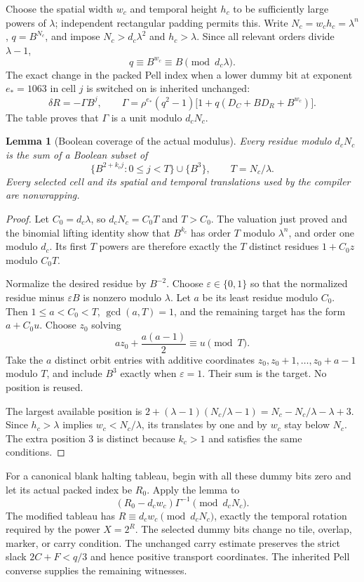 \documentclass[11pt,letterpaper]{article}
\newtheorem{lemma}[theorem]{Lemma}
\theoremstyle{remark}
\begin{document}
Choose the spatial width $w_c$ and temporal height $h_c$ to be sufficiently
large powers of $\lambda$; independent rectangular padding permits this.
Write $N_c=w_ch_c=\lambda^n$, $q=B^{N_c}$, and impose
$N_c>d_c\lambda^2$ and $h_c>\lambda$.  Since all relevant orders divide
$\lambda-1$,
\[
 q\equiv B^{w_c}\equiv B\pmod{d_c\lambda}.
\]
The exact change in the packed Pell index when a lower dummy bit at
exponent $e_*=1063$ in cell $j$ is switched on is inherited unchanged:
\[
 \delta R=-\Gamma B^j,\qquad
 \Gamma=\rho^{e_*}(q^2-1)
        \bigl[1+q(D_C+BD_R+B^{w_c})\bigr].
\]
The table proves that $\Gamma$ is a unit modulo $d_cN_c$.

\begin{lemma}[Boolean coverage of the actual modulus]\label{lem:padding}
Every residue modulo $d_cN_c$ is the sum of a Boolean subset of
\[
 \{B^{2+k_cj}:0\le j<T\}\cup\{B^3\},\qquad T=N_c/\lambda.
\]
Every selected cell and its spatial and temporal translations used by the
compiler are nonwrapping.
\end{lemma}
\begin{proof}
Let $C_0=d_c\lambda$, so $d_cN_c=C_0T$ and $T>C_0$.
The valuation just proved and the binomial lifting identity show that
$B^{k_c}$ has order $T$ modulo $\lambda^n$, and order one modulo $d_c$.
Its first $T$ powers are therefore exactly the $T$ distinct residues
$1+C_0z$ modulo $C_0T$.

Normalize the desired residue by $B^{-2}$.  Choose
$\varepsilon\in\{0,1\}$ so that the normalized residue minus
$\varepsilon B$ is nonzero modulo $\lambda$.  Let $a$ be its least
residue modulo $C_0$.  Then $1\le a<C_0<T$, $\gcd(a,T)=1$, and the
remaining target has the form $a+C_0u$.  Choose $z_0$ solving
\[
 az_0+\frac{a(a-1)}2\equiv u\pmod T.
\]
Take the $a$ distinct orbit entries with additive coordinates
$z_0,z_0+1,\ldots,z_0+a-1$ modulo $T$, and include $B^3$ exactly when
$\varepsilon=1$.  Their sum is the target.  No position is reused.

The largest available position is
$2+(\lambda-1)(N_c/\lambda-1)=N_c-N_c/\lambda-\lambda+3$.
Since $h_c>\lambda$ implies $w_c<N_c/\lambda$, its translates by one
and by $w_c$ stay below $N_c$.  The extra position 3 is distinct because
$k_c>1$ and satisfies the same conditions.
\end{proof}

For a canonical blank halting tableau, begin with all these dummy bits
zero and let its actual packed index be $R_0$.  Apply the lemma to
\[
 (R_0-d_cw_c)\Gamma^{-1}\pmod{d_cN_c}.
\]
The modified tableau has
$R\equiv d_cw_c\pmod{d_cN_c}$, exactly the temporal rotation required
by the power $X=2^R$.  The selected dummy bits change no tile, overlap,
marker, or carry condition.  The unchanged carry estimate preserves
the strict slack $2C+F<q/3$ and hence positive transport coordinates.
The inherited Pell converse supplies the remaining witnesses.
\end{document}
